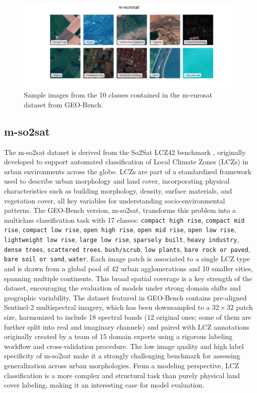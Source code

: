 \documentclass[a4paper, twoside, english]{sapthesis} %
\begin{document}
\begin{figure}[H]
    \centering
    \includegraphics[width=\textwidth]{img/m-eurosat_image_grid.png}
    \caption{\normalsize Sample images from the 10 classes contained in the m-eurosat dataset from GEO-Bench.}
    \label{fig:meurosatgrid}
\end{figure}

\vspace{1cm}


\subsection{m-so2sat}

The m-so2sat dataset is derived from the So2Sat LCZ42 benchmark \cite{zhu2019so2sat}, originally developed to support automated classification of Local Climate Zones (LCZs) in urban environments across the globe. LCZs are part of a standardized framework used to describe urban morphology and land cover, incorporating physical characteristics such as building morphology, density, surface materials, and vegetation cover, all key variables for understanding socio-environmental patterns.
The GEO-Bench version, m-so2sat, transforms this problem into a multiclass classification task with 17 classes: \texttt{compact high rise}, \texttt{compact mid rise}, \texttt{compact low rise}, \texttt{open high rise}, \texttt{open mid rise}, \texttt{open low rise}, \texttt{lightweight low rise}, \texttt{large low rise}, \texttt{sparsely built}, \texttt{heavy industry}, \texttt{dense trees}, \texttt{scattered trees}, \texttt{bush/scrub}, \texttt{low plants}, \texttt{bare rock or paved}, \texttt{bare soil or sand}, \texttt{water}. Each image patch is associated to a single LCZ type and is drawn from a global pool of 42 urban agglomerations and 10 smaller cities, spanning multiple continents. This broad spatial coverage is a key strength of the dataset, encouraging the evaluation of models under strong domain shifts and geographic variability.
The dataset featured in GEO-Bench contains pre-aligned Sentinel-2 multispectral imagery, which has been downsampled to a $32 \times 32$ patch size, harmonized to include 18 spectral bands (12 original ones; some of them are further split into real and imaginary channels) and paired with LCZ annotations originally created by a team of 15 domain experts using a rigorous labeling workflow and cross-validation procedure.
The low image quality and high label specificity of m-so2sat make it a strongly challenging benchmark for assessing generalization across urban morphologies. From a modeling perspective, LCZ classification is a more complex and structural task than purely physical land cover labeling, making it an interesting case for model evaluation.
\end{document}
